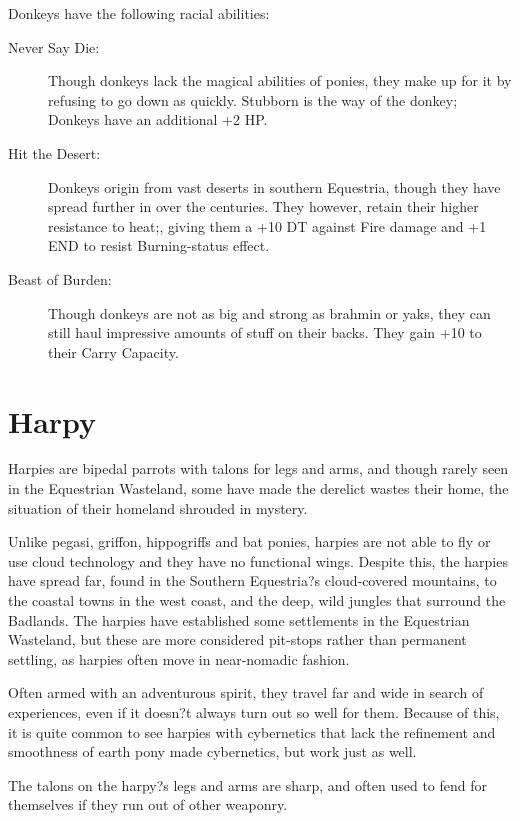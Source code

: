 \documentclass[11pt,a4paper,twocolumn]{book}
\begin{document}
	Donkeys have the following racial abilities:
	\begin{description}
		\item[Never Say Die:] Though donkeys lack the magical abilities of ponies, they make up for it by refusing to go down as quickly. Stubborn is the way of the donkey; Donkeys have an additional +2 HP.
		\item[Hit the Desert:] Donkeys origin from vast deserts in southern Equestria, though they have spread further in over the centuries. They however, retain their higher resistance to heat;, giving them a +10 DT against Fire damage and +1 END to resist Burning-status effect.
		\item[Beast of Burden:] Though donkeys are not as big and strong as brahmin or yaks, they can still haul impressive amounts of stuff on their backs. They gain +10 to their Carry Capacity.
	\end{description}

	\clearpage
	
	\section*{Harpy}
	
	Harpies are bipedal parrots with talons for legs and arms, and though rarely seen in the Equestrian Wasteland, some have made the derelict wastes their home, the situation of their homeland shrouded in mystery. 
	
	Unlike pegasi, griffon, hippogriffs and bat ponies, harpies are not able to fly or use cloud technology and they have no functional wings. Despite this, the harpies have spread far, found in the Southern Equestria?s cloud-covered mountains, to the coastal towns in the west coast, and the deep, wild jungles that surround the Badlands. The harpies have established some settlements in the Equestrian Wasteland, but these are more considered pit-stops rather than permanent settling, as harpies often move in near-nomadic fashion.
	
	Often armed with an adventurous spirit, they travel far and wide in search of experiences, even if it doesn?t always turn out so well for them. Because of this, it is quite common to see harpies with cybernetics that lack the refinement and smoothness of earth pony made cybernetics, but work just as well.
	
	The talons on the harpy?s legs and arms are sharp, and often used to fend for themselves if they run out of other weaponry. 
	
\end{document}
